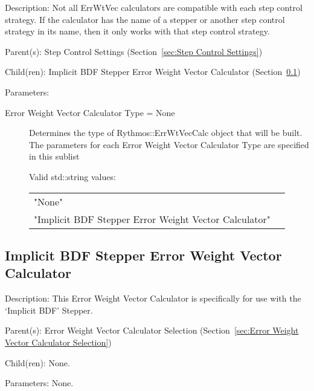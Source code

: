 \begin{list}{}
  {\setlength{\leftmargin}{1.0in}
   \setlength{\labelwidth}{0.75in}
   \setlength{\labelsep}{0.125in}}
  \item[Description:]
    Not all ErrWtVec calculators are compatible with each step control strategy.  If the calculator has the name of a stepper or another step control strategy in its name, then it only works with that step control strategy.
  \item[Parent(s):]
    Step Control Settings (Section~\ref{sec:Step Control Settings})
  \item[Child(ren):]
    Implicit BDF Stepper Error Weight Vector Calculator (Section~\ref{sec:Implicit BDF Stepper Error Weight Vector Calculator})
  \item[Parameters:]
    \begin{description}
      \item[Error Weight Vector Calculator Type = None] 
Determines the type of Rythmos::ErrWtVecCalc object that will be built.
The parameters for each Error Weight Vector Calculator Type are specified in this sublist

  Valid std::string values:

      \begin{tabular}{lp{}}
      "None" & \\ 
      "Implicit BDF Stepper Error Weight Vector Calculator" & \\ 
      \end{tabular}
\end{description}

\end{list}

\subsection{Implicit BDF Stepper Error Weight Vector Calculator}
\label{sec:Implicit BDF Stepper Error Weight Vector Calculator}

\begin{list}{}
  {\setlength{\leftmargin}{1.0in}
   \setlength{\labelwidth}{0.75in}
   \setlength{\labelsep}{0.125in}}
  \item[Description:]
    This Error Weight Vector Calculator is specifically for use with the `Implicit BDF' Stepper.
  \item[Parent(s):]
    Error Weight Vector Calculator Selection (Section~\ref{sec:Error Weight Vector Calculator Selection})
  \item[Child(ren):]
    None. 
  \item[Parameters:]
    None. 
\end{list}


